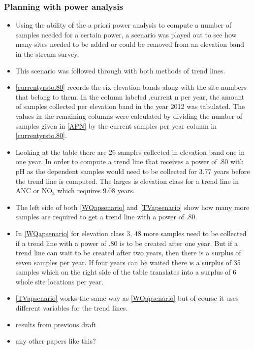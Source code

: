 \subsubsection{Planning with power analysis}
\begin{itemize}
	\item Using the ability of the a priori power analysis to compute a number of samples needed for a certain power, a scenario was played out to see how many sites needed to be added or could be removed from an elevation band in the stream survey.
	\item This scenario was followed through with both methods of trend lines.
	\item \autoref{currentyrsto.80} records the six elevation bands along with the site numbers that belong to them.  In the column labeled ,current n per year, the amount of samples collected per elevation band in the year 2012 was tabulated.  The values in the remaining columns were calculated by dividing the number of samples given in \autoref{APN} by the current samples per year column in \autoref{currentyrsto.80}.
	\item Looking at the table there are 26  samples collected in elevation band one in one year.  In order to compute a trend line that receives a power of .80 with pH as the dependent  samples would need to be collected for 3.77 years before the trend line is computed.   The larges is elevation class for a trend line in ANC or NO$_3$ which requires 9.08 years.
	
	\item The left side of both \autoref{WQapsenario} and \autoref{TVapsenario} show how many more samples are required to get a trend line with a power of .80. 
	\item  In \autoref{WQapsenario} for elevation class 3, 48 more samples need to be collected if a trend line with a power of .80 is to be created after one year.  But if a trend line can wait to be created after two years, then there is a surplus of seven samples per year.  If four years can be waited there is a surplus of 35 samples which on the right side of the table translates into a surplus of 6 whole site locations per year.
	\item \autoref{TVapsenario} works the same way as \autoref{WQapsenario} but of course it uses different variables for the trend lines.
	\item results from previous draft
	\item any other papers like this?
\end{itemize}
